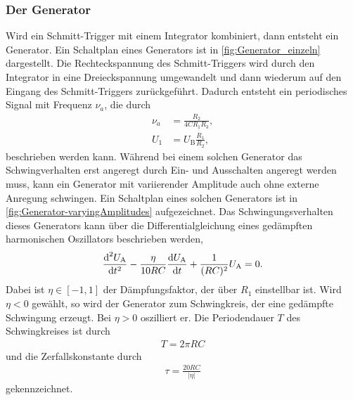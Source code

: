 \subsubsection{Der Generator}\label{subsubsec:Generator}                    %
Wird ein Schmitt-Trigger mit einem Integrator kombiniert, dann entsteht ein Generator.
Ein Schaltplan eines Generators ist in \autoref{fig:Generator_einzeln} dargestellt.
Die Rechteckspannung des Schmitt-Triggers wird durch den Integrator in eine Dreieckspannung umgewandelt und dann wiederum auf den Eingang des Schmitt-Triggers zurückgeführt.
Dadurch entsteht ein periodisches Signal mit Frequenz $\nu_a$, die durch 
\begin{align}
    \label{eq:generator}
    \nu_a &= \frac{R_2}{4CR_1R_3}, \\
    U_1 &= U_{\text{B}}\frac{R_1}{R_2},
\end{align}
beschrieben werden kann.
Während bei einem solchen Generator das Schwingverhalten erst angeregt durch Ein- und Ausschalten angeregt werden muss, kann ein Generator mit variierender Amplitude auch ohne externe Anregung schwingen.
Ein Schaltplan eines solchen Generators ist in \autoref{fig:Generator-varyingAmplitudes} aufgezeichnet.
Das Schwingungsverhalten dieses Generators kann über die Differentialgleichung eines gedämpften harmonischen Oszillators beschrieben werden,
\begin{align}
    \label{eq:DGLGenerator}
    \frac{\text d^2U_\text{A}}{\text dt^2}-\frac{\eta}{10RC}\frac{\text dU_\text{A}}{\text dt}+\frac{1}{(RC)^2}U_\text{A}=0.
\end{align}
Dabei ist $\eta\in[-1,1]$ der Dämpfungsfaktor, der über $R_1$ einstellbar ist.
Wird $\eta<0$ gewählt, so wird der Generator zum Schwingkreis, der eine gedämpfte Schwingung erzeugt.
Bei $\eta>0$ oszilliert er.
Die Periodendauer $T$ des Schwingkreises ist durch
\begin{align}
    \label{eq:PeriodendauerGenerator}
    T=2\pi RC
\end{align}
und die Zerfallskonstante durch 
\begin{align}
    \label{eq:ZeitkonstanteGenerator}
    \tau=\frac{20RC}{|\eta|}
\end{align}
gekennzeichnet.
